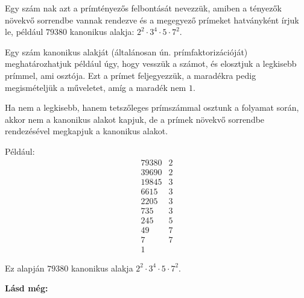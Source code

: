 \begin{defin2}
Egy szám nak azt a prímtényezős felbontását
nevezzük, amiben a tényezők növekvő sorrendbe vannak rendezve és a megegyező
prímeket hatványként írjuk le, például $79380$ kanonikus alakja:
$2^2 \cdot 3^4 \cdot 5 \cdot 7^2$.
\end{defin2}

\begin{method2}
Egy szám kanonikus alakját (általánosan ún. prímfaktorizációját)
meghatározhatjuk például úgy, hogy vesszük a számot, és elosztjuk a legkisebb
prímmel, ami osztója. Ezt a prímet feljegyezzük, a maradékra pedig
megismételjük a műveletet, amíg a maradék nem $1$.

Ha nem a legkisebb, hanem tetszőleges prímszámmal osztunk a folyamat során,
akkor nem a kanonikus alakot kapjuk, de a prímek növekvő sorrendbe rendezésével
megkapjuk a kanonikus alakot.

Például:
\[
\begin{array}{r|l}
  79380 & 2 \\
  39690 & 2 \\
  19845 & 3 \\
  6615 & 3 \\
  2205 & 3 \\
  735 & 3 \\
  245 & 5 \\
  49 & 7 \\
  7 & 7 \\
  1 &
\end{array}
\]

Ez alapján $79380$ kanonikus alakja $2^2 \cdot 3^4 \cdot 5 \cdot 7^2$.
\end{method2}

\textbf{Lásd még:}
